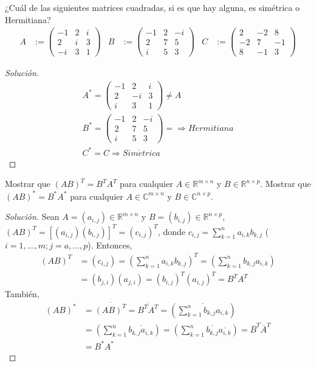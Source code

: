 \documentclass[12pt]{book}
\newcommand{\C}{\mathbb{C}}
\newcommand{\R}{\mathbb{R}}
\newenvironment{solution}
  {\renewcommand\qedsymbol{$\square$}\begin{proof}[Solución]}
  {\end{proof}}
\begin{document}
\exercise ¿Cuál de las siguientes matrices cuadradas, si es que hay alguna, es simétrica o Hermitiana?
\begin{align*}
    A&:=\begin{pmatrix} 
    -1 & 2 & i\\
    2 & i & 3\\
    -i & 3 & 1
    \end{pmatrix} & B&:=\begin{pmatrix}
    -1 & 2 & -i\\
    2 & 7 & 5\\
    i & 5 & 3
    \end{pmatrix} & C&:=\begin{pmatrix}
    2 & -2 & 8\\
    -2 & 7 & -1\\
    8 & -1 & 3
    \end{pmatrix}
\end{align*}

\begin{solution}
\begin{gather*}
    A^*=\begin{pmatrix}
    -1 & 2 & i\\
    2 & -i & 3\\
    i & 3 & 1
    \end{pmatrix}\neq A\\
    B^*=\begin{pmatrix}
    -1 & 2 & -i\\
    2 & 7 & 5\\
    i & 5 & 3
    \end{pmatrix}=\Rightarrow Hermitiana\\
    C^*=C\Rightarrow Sim\acute{e}trica
\end{gather*}
\end{solution}

\exercise Mostrar que $(AB)^T = B^TA^T$ para cualquier $A\in\R^{m\times n}$ y $B\in\R^{n\times p}$. Mostrar que $(AB)^*= B^{*} A^{*}$ para cualquier $A\in\C^{m\times n}$ y $B\in\C^{n\times p}$.
\begin{solution}
Sean $A=(a_{i,j})\in\R^{m\times n}$ y $B=(b_{i,j})\in\R^{n\times p}$, $(AB)^T=[(a_{i,j})(b_{i,j})]^T=(c_{i,j})^T$, donde $c_{i,j}=\sum_{k=1}^na_{i,k}b_{k,j}$ ($i=1, \dots, m; j=a, \dots, p$). Entonces,
\begin{align*}
    (AB)^T&=(c_{i,j})=\left(\sum_{k=1}^na_{i,k}b_{k,j}\right)^T=\left(\sum_{k=1}^nb_{k,j}a_{i,k}\right)\\
    &=(b_{j,i})(a_{j,i})=(b_{i,j})^T(a_{i,j})^T=B^TA^T
\end{align*}
También,
\begin{align*}
    (AB)^*&=\overline{(AB)^T}=\overline{B^TA^T}=\left(\overline{\sum_{k=1}^nb_{k,j}a_{i,k}}\right)\\
    &=\left(\sum_{k=1}^n\overline{b_{k,j}a_{i,k}}\right)=\left(\sum_{k=1}^n\overline{b_{k,j}} \overline{a_{i,k}}\right)=\overline{B}^T \overline{A}^T\\
    &=B^*A^*
\end{align*}
\end{solution}
\end{document}
